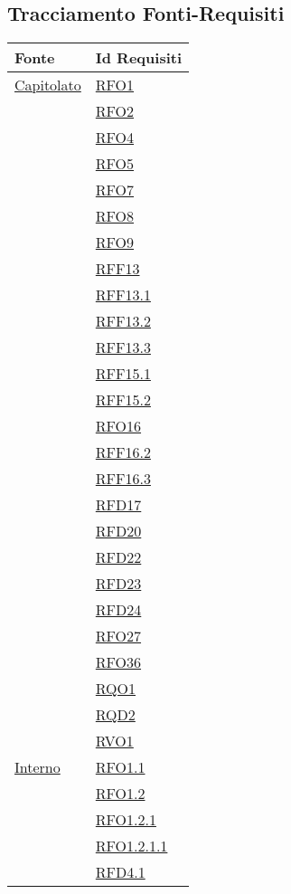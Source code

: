 \subsection{Tracciamento Fonti-Requisiti}
\normalsize
\begin{longtable}{|>{\centering}m{5cm}|m{5cm}<{\centering}|}
\hline
\textbf{Fonte} & \textbf{Id Requisiti}\\
\hline
\endhead
\hyperlink{Capitolato}{Capitolato} & \hyperlink{RFO1}{RFO1}\\
& \hyperlink{RFO2}{RFO2}\\
& \hyperlink{RFO4}{RFO4}\\
& \hyperlink{RFO5}{RFO5}\\
& \hyperlink{RFO7}{RFO7}\\
& \hyperlink{RFO8}{RFO8}\\
& \hyperlink{RFO9}{RFO9}\\
& \hyperlink{RFF13}{RFF13}\\
& \hyperlink{RFF13.1}{RFF13.1}\\
& \hyperlink{RFF13.2}{RFF13.2}\\
& \hyperlink{RFF13.3}{RFF13.3}\\
& \hyperlink{RFF15.1}{RFF15.1}\\
& \hyperlink{RFF15.2}{RFF15.2}\\
& \hyperlink{RFO16}{RFO16}\\
& \hyperlink{RFF16.2}{RFF16.2}\\
& \hyperlink{RFF16.3}{RFF16.3}\\
& \hyperlink{RFD17}{RFD17}\\
& \hyperlink{RFD20}{RFD20}\\
& \hyperlink{RFD22}{RFD22}\\
& \hyperlink{RFD23}{RFD23}\\
& \hyperlink{RFD24}{RFD24}\\
& \hyperlink{RFO27}{RFO27}\\
& \hyperlink{RFO36}{RFO36}\\
& \hyperlink{RQO1}{RQO1}\\
& \hyperlink{RQD2}{RQD2}\\
& \hyperlink{RVO1}{RVO1}\\ \hline
\hyperlink{Interno}{Interno} & \hyperlink{RFO1.1}{RFO1.1}\\
& \hyperlink{RFO1.2}{RFO1.2}\\
& \hyperlink{RFO1.2.1}{RFO1.2.1}\\
& \hyperlink{RFO1.2.1.1}{RFO1.2.1.1}\\
& \hyperlink{RFD4.1}{RFD4.1}\\

\end{longtable}
